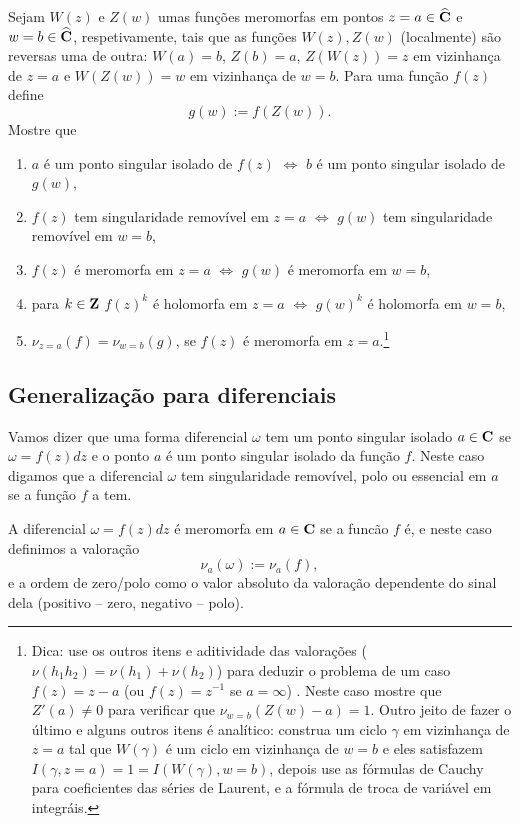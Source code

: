 \begin{problema}
\label{p:valoracao-independencia}
Sejam
$W(z)$ e $Z(w)$ umas funções meromorfas
em pontos $z=a\in\widehat{\mathbf{C}}$ e $w=b\in\widehat{\mathbf{C}}$, respetivamente,
tais que
as funções $W(z),Z(w)$ (localmente) são reversas uma de outra:
$W(a) = b$, $Z(b) = a$,
$Z(W(z)) = z$ em vizinhança de $z=a$
e $W(Z(w)) = w$ em vizinhança de $w=b$.
Para uma função $f(z)$ define
\[ g(w) := f(Z(w)). \]
Mostre que
\begin{enumerate}
\item $a$ é um ponto singular isolado de $f(z)$ $\iff$ $b$ é um ponto singular isolado de $g(w)$,
\item $f(z)$ tem singularidade removível em $z=a$ $\iff$ $g(w)$ tem singularidade removível em $w=b$,
\item $f(z)$ é meromorfa em $z=a$ $\iff$ $g(w)$ é meromorfa em $w=b$,
\item para $k\in\mathbf{Z}$ $f(z)^k$ é holomorfa em $z=a$ $\iff$ $g(w)^k$ é holomorfa em $w=b$,
\item $\nu_{z=a}(f) = \nu_{w=b}(g)$, se $f(z)$ é meromorfa em $z=a$.\footnote{Dica:
use os outros itens e aditividade das valorações ($\nu(h_1 h_2) = \nu(h_1) + \nu(h_2)$)
para deduzir o problema de um caso $f(z) = z-a$ (ou $f(z) =z^{-1}$ se $a=\infty$) .
Neste caso mostre que $Z'(a) \neq 0$ para verificar que $\nu_{w=b}(Z(w)-a) = 1$.
Outro jeito de fazer o último e alguns outros itens é analítico:
construa um ciclo $\gamma$ em vizinhança de $z=a$ tal que $W(\gamma)$ é
um ciclo em vizinhança de $w=b$ e eles satisfazem $I(\gamma,z=a) = 1 = I(W(\gamma),w=b)$,
depois use as fórmulas de Cauchy para coeficientes das séries de Laurent,
e a fórmula de troca de variável em integráis.}
\end{enumerate}
\end{problema}

\subsection{Generalização para diferenciais}
Vamos dizer que uma forma diferencial $\omega$ tem um ponto singular isolado $a\in\mathbf{C}$
se $\omega = f(z) dz$ e o ponto $a$ é um ponto singular isolado da função $f$.
Neste caso digamos que a diferencial $\omega$ tem singularidade removível, polo ou essencial em $a$
se a função $f$ a tem. 

A diferencial $\omega = f(z) dz$ é meromorfa em $a\in\mathbf{C}$ se a funcão $f$ é, e neste caso definimos
a valoração
\[ \nu_a(\omega) := \nu_a(f),\]
e a ordem de zero/polo como o valor absoluto da valoração dependente do sinal dela
(positivo -- zero, negativo -- polo).

